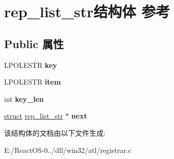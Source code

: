 \hypertarget{structrep__list__str}{}\section{rep\+\_\+list\+\_\+str结构体 参考}
\label{structrep__list__str}
\subsection*{Public 属性}
\begin{DoxyCompactItemize}
\item 
\mbox{\label{structrep__list__str_ad263ad85dd259e8e428dc53da177fd1a}} 
L\+P\+O\+L\+E\+S\+TR {\bfseries key}
\item 
\mbox{\label{structrep__list__str_a1eb52c48fddd36a87dd9b793763d8085}} 
L\+P\+O\+L\+E\+S\+TR {\bfseries item}
\item 
\mbox{\label{structrep__list__str_ad755eae070e1f9504ef55c204e9bffaa}} 
int {\bfseries key\+\_\+len}
\item 
\mbox{\label{structrep__list__str_af106fe2969cefde3c1c22d1250c2af9f}} 
\hyperlink{interfacestruct}{struct} \hyperlink{structrep__list__str}{rep\+\_\+list\+\_\+str} $\ast$ {\bfseries next}
\end{DoxyCompactItemize}


该结构体的文档由以下文件生成\+:\begin{DoxyCompactItemize}
\item 
E\+:/\+React\+O\+S-\/0../dll/win32/atl/registrar.\+c\end{DoxyCompactItemize}

